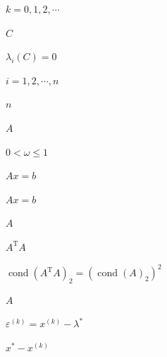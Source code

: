 \documentclass[UTF8,fontset=fandol]{ctexart}
\begin{document}
$k=0,1,2,\cdots$\par

$C$\par

$\lambda_i(C)=0$\par

$i=1,2,\cdots,n$\par

$n$\par

$A$\par

$0<\omega\leqslant1$\par

$Ax=b$\par

$Ax=b$\par

$A$\par

$A^{\mathrm T}A$\par

$\operatorname{cond}(A^{\mathrm T}A)_2=(\operatorname{cond}(A)_2)^2$\par

$A$\par

$\varepsilon^{(k)}=x^{(k)}-\lambda^*$\par

$x^*-x^{(k)}$\par
\end{document}
